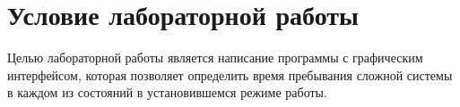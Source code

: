 \chapter*{Условие лабораторной работы}

Целью лабораторной работы является написание программы с графическим интерфейсом, которая позволяет определить время пребывания сложной системы в каждом из состояний в установившемся режиме работы.
	